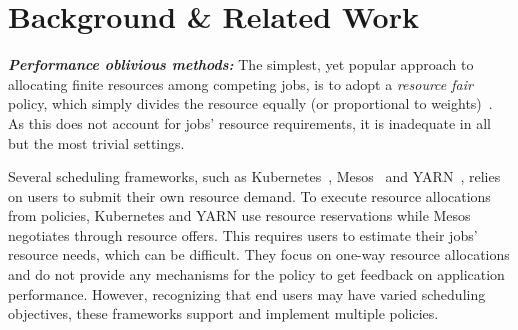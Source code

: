 

\insertTableRelatedWork{}

\section{Background \& Related Work}
\label{sec:related}


\newcommand{\relworkheading}[1]{\textbf{\textit{#1:}}}

\relworkheading{Performance oblivious methods}
The simplest, yet popular approach to allocating finite resources
among competing jobs, is to adopt a \emph{resource fair} policy,
which simply divides the resource equally
(or proportional to weights)~\cite{jiang2012improving,isard2009quincy,hadoopfs,mo2000fair}.
As this does not account for jobs'
resource requirements, it is inadequate in 
all but the most trivial settings.  




Several scheduling frameworks, such as Kubernetes~\cite{kubernetes},
Mesos~\cite{mesos} and YARN~\cite{yarn},
relies on users to submit their own resource demand.
To execute resource allocations from policies,
Kubernetes and YARN use resource reservations while Mesos negotiates through
resource offers.
This requires users to estimate their jobs' resource needs, which can be difficult.
They focus on one-way resource allocations
and do not provide any mechanisms for the policy
to get feedback on application performance.
However,
recognizing that end users may have varied scheduling objectives,
these frameworks support and implement multiple policies.


